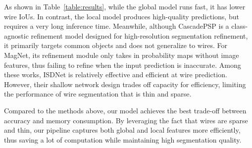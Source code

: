 As shown in Table~\ref{table:results}, while the global model runs fast, it has lower wire IoUs. In contrast, the local model produces high-quality predictions, but requires a very long inference time.
Meanwhile, although CascadePSP is a class-agnostic refinement model designed for high-resolution segmentation refinement, it primarily targets common objects and does not generalize to wires. 
For MagNet, its refinement module only takes in probability maps without image features, thus failing to refine when the input prediction is inaccurate. 
Among these works, ISDNet is relatively effective and efficient at wire prediction. 
However, their shallow network design trades off capacity for efficiency, limiting the performance of wire segmentation that is thin and sparse. 

Compared to the methods above, our model achieves the best trade-off between accuracy and memory consumption. By leveraging the fact that wires are sparse and thin, our pipeline captures both global and local features more efficiently, thus saving a lot of computation while maintaining high segmentation quality.

